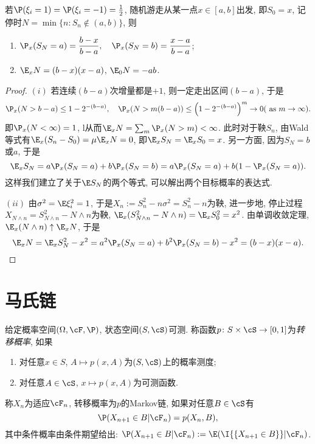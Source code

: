 \documentclass[a4paper, 10pt]{ctexart}
\begin{document}
\begin{theorem}[$\Z^1$上的对称随机游走]
	若$\P(\xi_i = 1) = \P(\xi_i = -1) = \frac12$, 随机游走从某一点$x \in [a, b]$出发, 即$S_0 = x$, 记停时$N = \min\{n \colon S_n \notin (a,b)\}$, 则
	\begin{enumerate}[label=(\roman*)]
		\item $\displaystyle \P_x(S_N = a) = \frac{b-x}{b-a}, \quad \P_x(S_N = b) = \frac{x-a}{b-a}$; 
		\item $\E_x N = (b-x)(x-a)$, $\E_0 N = -ab$. 
	\end{enumerate}
\end{theorem}
\begin{proof}
	$(i)$ 
	若连续$(b-a)$次增量都是$+1$, 则一定走出区间$(b-a)$, 于是
	\begin{equation*}
		\P_x(N > b-a) \leq 1 - 2^{-(b-a)}, \quad
		\P_x(N > m(b-a)) \leq \left(1 - 2^{-(b-a)} \right)^m \to 0 (\text{ as } m \to \infty).  
	\end{equation*}
	即$\P_x(N < \infty) = 1$, l从而$\E_x N = \sum_m \P_x(N > m) < \infty$. 
	此时对于鞅$S_n$, 由Wald等式有$\E_x(S_n - S_0) = \mu \E_x N = 0$, 即$\E_x S_N = \E_x S_0 = x$. 
	另一方面, 因为$S_N = b$或$a$, 于是
	\begin{equation*}
		\E_x S_N = a \P_x(S_N = a) + b \P_x(S_N =b) = a \P_x(S_N = a) + b (1-\P_x(S_N = a)). 
	\end{equation*}
	这样我们建立了关于$\E S_N$的两个等式, 可以解出两个目标概率的表达式. 
	
	\noindent $(ii)$ 
	由$\sigma^2 =  \E \xi_i^2 = 1$, 于是$X_n := S_n^2 - n \sigma^2 = S_n^2 - n$为鞅, 进一步地, 停止过程$X_{N \wedge n} = S_{N \wedge n}^2 - N \wedge n$为鞅, $\E_x (S_{N \wedge n}^2 - N \wedge n) = \E_x S_0^2 = x^2$. 
	由单调收敛定理, $\E_x (N \wedge n) \uparrow \E_x N$, 于是
	\begin{equation*}
		\E_x N 
		= \E_x S_N^2 - x^2 
		= a^2 \P_x(S_N = a) + b^2 \P_x(S_N = b) - x^2
		= (b-x)(x-a). 
	\end{equation*}
\end{proof}

\newpage
\section{马氏链}

\noindent
给定概率空间$(\Omega, \cF, \P)$, 状态空间$(S, \cS)$可测. 
称函数$p \colon S \times \cS \to [0, 1]$为\emph{转移概率}, 如果
\begin{enumerate}[label=(\roman*)]
	\item 对任意$x \in S$, $A \mapsto p(x,A)$为$(S,\cS)$上的概率测度; 
	\item 对任意$A \in \cS$, $x \mapsto p(x,A)$为可测函数. 
\end{enumerate}
称$X_n$为适应$\cF_n$, 转移概率为$p$的Markov链, 如果对任意$B \in \cS$有
\begin{equation}\label{eq:MarkovChain}
	\P(X_{n+1} \in B | \cF_n) = p(X_n,B), 
\end{equation}
其中条件概率由条件期望给出: $\P(X_{n+1} \in B | \cF_n) := \E(\I{\{X_{n+1} \in B\}} | \cF_n)$. 
\end{document}
